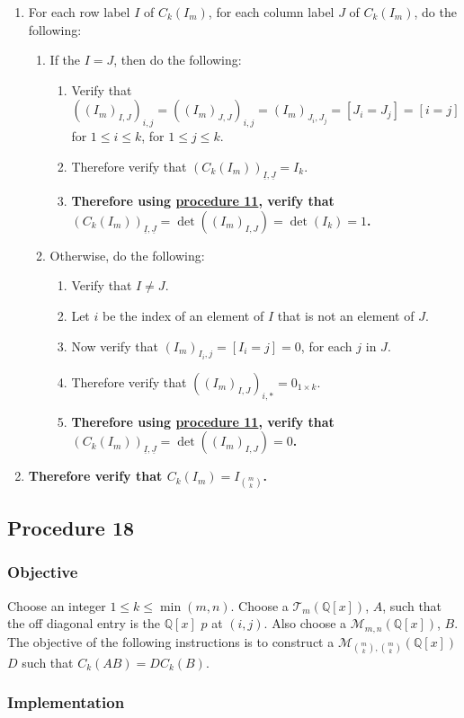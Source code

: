 \documentclass[twocolumn]{article}
\newcommand{\ul}[1]{\underline{#1}}
\newcommand{\procedure}[2][]{\subsection*{Procedure #2 \ifthenelse{\equal{#1}{}}{}{(#1)}}\label{sec:procedure #2}}
\newcommand{\objective}{\subsubsection*{Objective}}
\newcommand{\implementation}{\subsubsection*{Implementation}}
\begin{document}
				\begin{enumerate}
					\item For each row label $I$ of $C_k(I_m)$, for each column label $J$ of $C_k(I_m)$, do the following:
					\begin{enumerate}
						\item If the $I=J$, then do the following:
						\begin{enumerate}
							\item Verify that $((I_m)_{I,J})_{i,j}=((I_m)_{J,J})_{i,j}=(I_m)_{J_i,J_j}=[J_i=J_j]=[i=j]$ for $1\le i\le k$, for $1\le j\le k$.
							\item Therefore verify that $(C_k(I_m))_{\ul{I},\ul{J}}=I_k$.
							\item \textbf{Therefore using \hyperref[sec:procedure 11]{procedure 11}, verify that $(C_k(I_m))_{\ul{I},\ul{J}}=\det((I_m)_{I,J})=\det(I_k)=1$.}
						\end{enumerate}
						\item Otherwise, do the following:
						\begin{enumerate}
							\item Verify that $I\ne J$.
							\item Let $i$ be the index of an element of $I$ that is not an element of $J$.
							\item Now verify that $(I_m)_{I_i,j}=[I_i=j]=0$, for each $j$ in $J$.
							\item Therefore verify that $((I_m)_{I,J})_{i,*}=0_{1\times k}$.
							\item \textbf{Therefore using \hyperref[sec:procedure 11]{procedure 11}, verify that $(C_k(I_m))_{\ul{I},\ul{J}}=\det((I_m)_{I,J})=0$.}
						\end{enumerate}
					\end{enumerate}
					\item \textbf{Therefore verify that $C_k(I_m)=I_{\binom{m}{k}}$.}	
				\end{enumerate}
		\procedure{18}
			\objective
				Choose an integer $1\le k\le\min(m,n)$. Choose a $\mathcal{T}_{m}(\mathbb{Q}[x])$, $A$, such that the off diagonal entry is the $\mathbb{Q}[x]$ $p$ at $(i,j)$. Also choose a $\mathcal{M}_{m,n}(\mathbb{Q}[x])$, $B$. The objective of the following instructions is to construct a $\mathcal{M}_{\binom{m}{k},\binom{m}{k}}(\mathbb{Q}[x])$ $D$ such that $C_k(AB)=DC_k(B)$.
			\implementation
\end{document}
